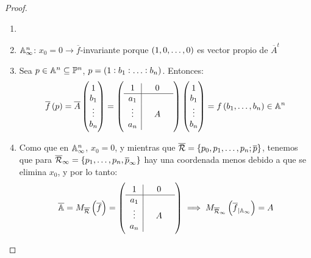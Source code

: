     \begin{proof}
        \begin{enumerate}
            \item[]
            \item $\mathbb{A}_\infty^n$: $x_0=0 \rightarrow \overline{f}$-invariante porque $\left(1,0,\ldots,0\right)$ es vector propio de $\overline{A}^t$
            \item Sea $p\in\mathbb{A}^n\subseteq\mathbb{P}^n$, $p=\left(1:b_1:\ldots:b_n\right)$. Entonces:
            \begin{gather*}
                \overline{f}\left( p \right) = \overline{A} 
                \begin{pmatrix}
                    1 \\
                    b_1\\
                    \vdots \\
                    b_n\\
                \end{pmatrix}
                = 
                \left(
            \begin{array}{c|ccc}
                1 &  & 0 &  \\ \hline
                a_1 & & & \\
                \vdots & & A & \\
                a_n & & & 
            \end{array} \right)
            \begin{pmatrix}
                1\\
                b_1\\
                \vdots\\
                b_n\\
            \end{pmatrix}
            = f\left( b_1,\ldots,b_n \right)\in \mathbb{A}^n
            \end{gather*}
            \item Como que en $\mathbb{A}_\infty^n$, $x_0 =0$, y mientras que $\overline{\mathcal{R}}=\{p_0, p_1, \dots, p_n; \overline{p}\}$, tenemos que para $\overline{\mathcal{R}}_\infty = \{p_1, \dots, p_n, \overline{p}_\infty\}$ hay una coordenada menos debido a que se elimina $x_0$, y por lo tanto:
            \begin{gather*}
                \overline{\mathbb{A}} = M_{\overline{\mathcal{R}}}\left( \overline{f}\right) = \left(
                \begin{array}{c|ccc}
                    1 &  & 0 & \\ \hline
                    a_1 & & & \\
                    \vdots & & A & \\
                    a_n & & & 
                \end{array} \right) 
                \implies 
                M_{\overline{\mathcal{R}}_\infty}\left( \overline{f}_{|\mathbb{A}_\infty} \right) = A
            \end{gather*}
        \end{enumerate}
    \end{proof}
